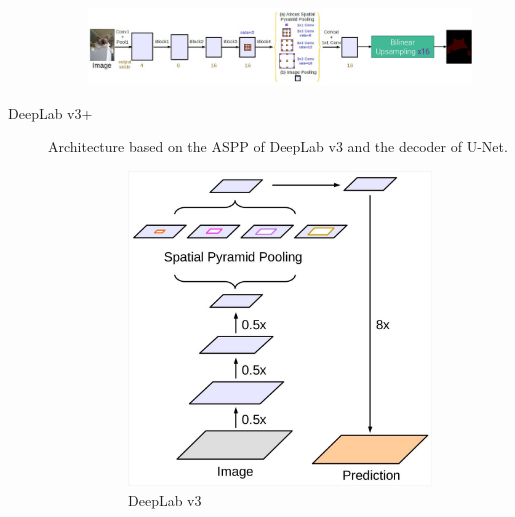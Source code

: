 \begin{description}
        \begin{figure}[H]
            \centering
            \includegraphics[width=0.95\linewidth]{./img/_deeplabv3.jpg}
        \end{figure}

    \item[DeepLab v3+] 
        Architecture based on the ASPP of DeepLab v3 and the decoder of U-Net.

        \begin{figure}[H]
            \centering
            \begin{subfigure}{0.3\linewidth}
                \centering
                \includegraphics[width=0.9\linewidth]{./img/_deeplabv3plus_1.jpg}
                \caption{DeepLab v3}
            \end{subfigure}
            \begin{subfigure}{0.3\linewidth}
                \centering

\end{subfigure}
\end{figure}
\end{description}
